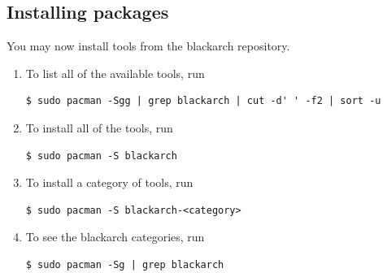 \documentclass[a4paper, oneside, 11pt]{book}
\begin{document}
\subsection{Installing packages}
You may now install tools from the blackarch repository.
\begin{enumerate}
\item To list all of the available tools, run
{\small
\color{gray}
\begin{verbatim}
$ sudo pacman -Sgg | grep blackarch | cut -d' ' -f2 | sort -u
\end{verbatim}
}
\item To install all of the tools, run
{\small
\color{gray}
\begin{verbatim}
$ sudo pacman -S blackarch
\end{verbatim}
}
\item To install a category of tools, run
{\small
\color{gray}
\begin{verbatim}
$ sudo pacman -S blackarch-<category>
\end{verbatim}
}
\item To see the blackarch categories, run
{\small
\color{gray}
\begin{verbatim}
$ sudo pacman -Sg | grep blackarch
\end{verbatim}
}
\end{enumerate}
\end{document}
